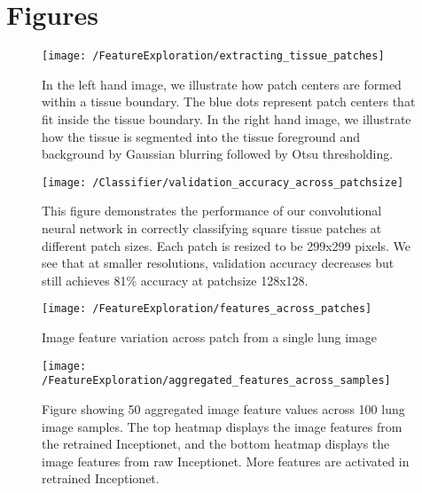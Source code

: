 \documentclass[graybox]{svmult}
\begin{document}



\section{Figures}

\begin{figure}[H]
\centering
\texttt{[image: /FeatureExploration/extracting\_tissue\_patches]}
\caption{In the left hand image, we illustrate how patch centers are formed within a tissue boundary. The blue dots represent patch centers that fit inside the tissue boundary. In the right hand image, we illustrate how the tissue is segmented into the tissue foreground and background by Gaussian blurring followed by Otsu thresholding.}
\label{fig:extracting_tissue_patches}
\end{figure}

\begin{figure}[H]
\centering
\texttt{[image: /Classifier/validation\_accuracy\_across\_patchsize]}
\caption{This figure demonstrates the performance of our convolutional neural network in correctly classifying square tissue patches at different patch sizes. Each patch is resized to be 299x299 pixels. We see that at smaller resolutions, validation accuracy decreases but still achieves 81\% accuracy at patchsize 128x128.}
\label{fig:validation_accuracy_across_patchsize}
\end{figure}


\begin{figure}[H]
\centering
\texttt{[image: /FeatureExploration/features\_across\_patches]}
\caption{Image feature variation across patch from a single lung image}
\label{fig:features_across_patches}
\end{figure}


\begin{figure}[H]
\centering
\texttt{[image: /FeatureExploration/aggregated\_features\_across\_samples]}
\caption{Figure showing 50 aggregated image feature values across 100 lung image samples. The top heatmap displays the image features from the retrained Inceptionet, and the bottom heatmap displays the image features from raw Inceptionet. More features are activated in retrained Inceptionet.}
\label{fig:aggregated_features_across_samples}
\end{figure}
\end{document}
